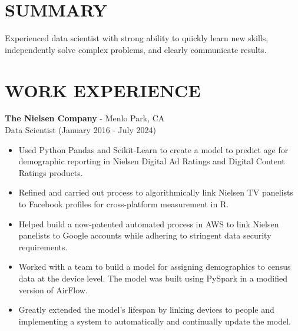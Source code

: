\documentclass[11pt]{res} %
\begin{document}
 
\raggedright
\address{60 Saturn Street $\bullet$ San Francisco, CA 94114\\
(415)997-9916 $\bullet$ ebirdbrydon@gmail.com}
  
\begin{resume}
\section{SUMMARY}
Experienced data scientist with strong ability to quickly learn new skills, independently solve complex problems, and clearly communicate results.

\section{WORK EXPERIENCE} 

\textbf{The Nielsen Company} - Menlo Park, CA
\\Data Scientist (January 2016 - July 2024)
\begin{itemize} \itemsep -0pt 
\item Used Python Pandas and Scikit-Learn to create a model to predict age for demographic reporting in Nielsen Digital Ad Ratings and Digital Content Ratings products.
\item Refined and carried out process to algorithmically link Nielsen TV panelists to Facebook profiles for cross-platform measurement in R.
\item Helped build a now-patented automated process in AWS to link Nielsen panelists to Google accounts while adhering to stringent data security requirements.
\item Worked with a team to build a model for assigning demographics to census data at the device level. The model was built using PySpark in a modified version of AirFlow. 
\item Greatly extended the model's lifespan by linking devices to people and implementing a system to automatically and continually update the model.
\end{itemize}


\end{resume}
\end{document}
